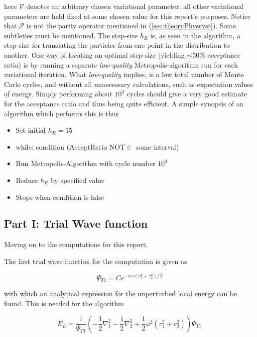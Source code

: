 \documentclass[aip,nobalancelastpage,
twocolumn,
rsi,%
 amsmath,amssymb,
 reprint,%
]{revtex4}
\begin{document}
here $\mathcal{V}$ denotes an arbitrary chosen variational parameter, all other variational parameters are held fixed at some chosen value for this report's purposes. Notice that $\mathcal{P}$ is not the parity operator mentioned in (\ref{sec:theoryPhyssyst}). Some subtleties must be mentioned. The step-size $h_R$ is, as seen in the algorithm, a step-size for translating the particles from one point in the distribution to another. One way of locating an optimal step-size (yielding $\sim 50\%$ acceptance ratio) is by running a separate \textit{low-quality} Metropolis-algorithm run for each variational iteration. What \textit{low-quality} implies, is a low total number of Monte Carlo cycles, and without all unnecessary calculations, such as expectation values of energy. Simply performing about $10^3$ cycles should give a very good estimate for the acceptance ratio and thus being quite efficient. A simple synopsis of an algorithm which performs this is thus
\begin{itemize}
\item Set initial $h_R=15$
\item while: condition (AcceptRatio NOT$\in$ some interval)
\item Run Metropolis-Algorithm with cycle number $10^3$
\item Reduce $h_R$ by specified value
\item Stops when condition is false
\end{itemize}

\subsection{\label{sec:Method:subsec:Part I}Part I: Trial Wave function}
Moving on to the computations for this report.\par

The first trial wave function for the computation is given as 


\begin{equation}
\label{TrialFunction1}
\Psi_{T1} = Ce^{-\alpha \omega(r_1^2 + r_2^2)/2}
\end{equation}

with which an analytical expression for the unperturbed local energy can be found. This is needed for the algorithm

\begin{equation}
\label{LocalEnergyUnperturbedSetup}
E_L = \frac{1}{\Psi_{T1}}\left( -\frac{1}{2}\nabla_1^2 -\frac{1}{2}\nabla_2^2 + \frac{1}{2}\omega^2 (r_1^2+r_2^2)\right) \Psi_{T1}
\end{equation}
\end{document}
